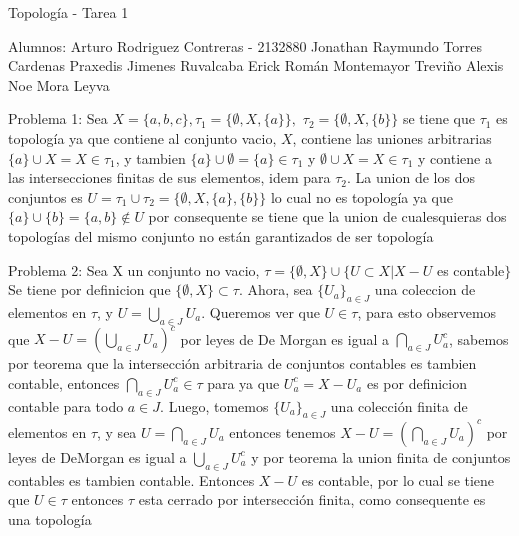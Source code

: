 \documentclass[12pt]{article}
\begin{document}
\begin{Large}
 Topolog\'ia - Tarea 1 \newline
\end{Large}
Alumnos: \newline
Arturo Rodriguez Contreras - 2132880 \newline
Jonathan Raymundo Torres Cardenas \newline
Praxedis Jimenes Ruvalcaba \newline
Erick Rom\'an Montemayor Trevi\~no \newline
Alexis Noe Mora Leyva \newline


Problema 1:\newline
Sea
$X = \{ a, b, c \}, \tau_{1} = \{\emptyset, X, \{a\} \}, $
$ \tau_{2} = \{\emptyset, X, \{b\} \}$
se tiene que $\tau_{1}$ es topolog\'ia ya que contiene
al conjunto vacio, $X$, contiene las uniones arbitrarias
$\{a\} \cup X = X \in \tau_{1}$, y tambien
$\{a\} \cup \emptyset = \{a\} \in \tau_{1}$
y $\emptyset \cup X = X \in \tau_{1}$
y contiene a las intersecciones finitas de sus elementos, 
idem para $\tau_{2}$. La union de los dos conjuntos es
$U = \tau_{1} \cup \tau_{2} = \{ \emptyset, X, \{a\}, \{b\} \}$
lo cual no es topolog\'ia ya que $\{a\} \cup \{b\} = \{a, b\} \notin U$
por consequente se tiene que la union de cualesquieras dos
topolog\'ias del mismo conjunto no est\'an
garantizados de ser topolog\'ia \newline

\hfill \break

Problema 2: \newline
Sea X un conjunto no vacio,
$\tau = \{\emptyset, X\} \cup \{U \subset X | X - U$ es contable$\} $
Se tiene por definicion que $\{\emptyset, X\} \subset \tau$.
Ahora, sea $\{U_{a}\}_{a \in J}$ una coleccion de elementos en $\tau$,
y $U = \bigcup_{a \in J} U_{a}$. Queremos ver que $U \in \tau$, para
esto observemos que $X - U = (\bigcup_{a \in J} U_{a})^{c} $
por leyes de De Morgan es igual a
$\bigcap_{a \in J} U_{a}^{c}$, sabemos por teorema que
la intersecci\'on arbitraria de conjuntos contables es tambien
contable, entonces $\bigcap_{a \in J} U_{a}^{c} \in \tau$ para
ya que $U_{a}^{c} = X - U_{a}$ es por definicion contable
para todo $a \in J$. Luego, tomemos
$\{U_{a}\}_{a \in J}$ una colecci\'on finita de elementos en
$\tau$, y sea $U = \bigcap_{a \in J}U_{a}$ entonces tenemos
$X - U = (\bigcap_{a \in J}U_{a})^{c}$ por leyes de DeMorgan
es igual a $\bigcup_{a \in J}U_{a}^{c}$ y por teorema
la union finita de conjuntos contables es tambien
contable. Entonces $X - U$ es contable, por lo cual
se tiene que $U \in \tau$ entonces $\tau$ esta
cerrado por intersecci\'on finita, como consequente es
una topolog\'ia\newline
\end{document}
